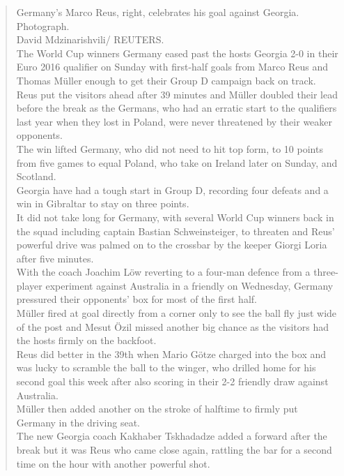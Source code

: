 \documentclass[a4paper, 12pt]{article}
\begin{document}
\begin{quotation}
Germany's Marco Reus,  right,  celebrates his goal against Georgia.\\
Photograph.\\
David Mdzinarishvili/ REUTERS.\\
The World Cup winners Germany eased past the hosts Georgia 2-0 in their Euro 2016 qualifier on Sunday with first-half goals from Marco Reus and Thomas Müller enough to get their Group D campaign back on track.\\
Reus put the visitors ahead after 39 minutes and Müller doubled their lead before the break as the Germans,  who had an erratic start to the qualifiers last year when they lost in Poland,  were never threatened by their weaker opponents.\\
The win lifted Germany,  who did not need to hit top form,  to 10 points from five games to equal Poland,  who take on Ireland later on Sunday,  and Scotland.\\
Georgia have had a tough start in Group D,  recording four defeats and a win in Gibraltar to stay on three points.\\
It did not take long for Germany,  with several World Cup winners back in the squad including captain Bastian Schweinsteiger,  to threaten and Reus’ powerful drive was palmed on to the crossbar by the keeper Giorgi Loria after five minutes.\\
With the coach Joachim Löw reverting to a four-man defence from a three-player experiment against Australia in a friendly on Wednesday,  Germany pressured their opponents’ box for most of the first half.\\
Müller fired at goal directly from a corner only to see the ball fly just wide of the post and Mesut Özil missed another big chance as the visitors had the hosts firmly on the backfoot.\\
Reus did better in the 39th when Mario Götze charged into the box and was lucky to scramble the ball to the winger,  who drilled home for his second goal this week after also scoring in their 2-2 friendly draw against Australia.\\
Müller then added another on the stroke of halftime to firmly put Germany in the driving seat.\\
The new Georgia coach Kakhaber Tskhadadze added a forward after the break but it was Reus who came close again,  rattling the bar for a second time on the hour with another powerful shot.\\

\end{quotation}
\end{document}
